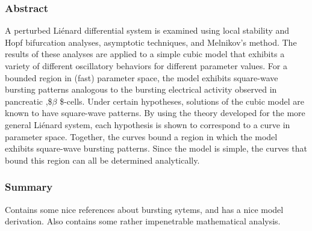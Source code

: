 \documentclass[11pt]{article}
\begin{document}
\subsubsection{Abstract}
\label{sec:orga15b1a2}
A perturbed Liénard differential system is examined using local
stability and Hopf bifurcation analyses, asymptotic techniques, and
Melnikov's method. The results of these analyses are applied to a
simple cubic model that exhibits a variety of different oscillatory
behaviors for different parameter values. For a bounded region in
(fast) parameter space, the model exhibits square-wave bursting
patterns analogous to the bursting electrical activity observed in
pancreatic ,\$\(\beta\) \$-cells. Under certain hypotheses, solutions of the
cubic model are known to have square-wave patterns. By using the
theory developed for the more general Liénard system, each hypothesis
is shown to correspond to a curve in parameter space. Together, the
curves bound a region in which the model exhibits square-wave bursting
patterns. Since the model is simple, the curves that bound this region
can all be determined analytically.

\subsubsection{Summary}
\label{sec:orged328a9}
Contains some nice references about bursting sytems, and has a nice model derivation.
Also contains some rather impenetrable mathematical analysis.
\end{document}
